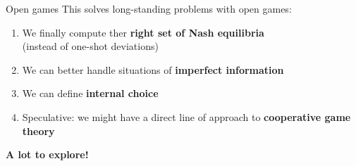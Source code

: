 \begin{frame}{Open games}
	This solves long-standing problems with open games:

	\vfill
	\begin{enumerate}
		\item We finally compute ther \textbf{right set of Nash equilibria}\\
		(instead of one-shot deviations)
		\item We can better handle situations of \textbf{imperfect information}
		\item We can define \textbf{internal choice}
		\item Speculative: we might have a direct line of approach to \textbf{cooperative game theory}
	\end{enumerate}

	\vfill
	\begin{center}
	\bfseries
	\large
		A lot to explore!
	\end{center}
\end{frame}
